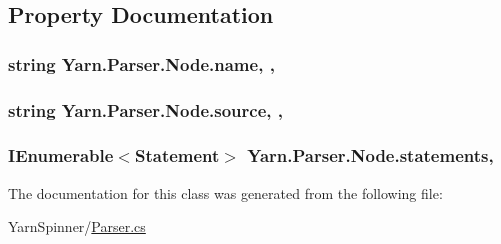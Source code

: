 \subsection{Property Documentation}
\hypertarget{a00054_a3cfa07840da3a7a92c820788e902aefb}{
\subsubsection[{name}]{\setlength{\rightskip}{0pt plus 5cm}string Yarn.\-Parser.\-Node.\-name\hspace{0.3cm}{\ttfamily [get]}, {\ttfamily [set]}, {\ttfamily [package]}}}\label{a00054_a3cfa07840da3a7a92c820788e902aefb}
\hypertarget{a00054_a005a6b0f614beb77708fc5ce8fea66e1}{
\subsubsection[{source}]{\setlength{\rightskip}{0pt plus 5cm}string Yarn.\-Parser.\-Node.\-source\hspace{0.3cm}{\ttfamily [get]}, {\ttfamily [set]}, {\ttfamily [package]}}}\label{a00054_a005a6b0f614beb77708fc5ce8fea66e1}
\hypertarget{a00054_abdae3fb1c6927b38ce29b1b71a00cb12}{
\subsubsection[{statements}]{\setlength{\rightskip}{0pt plus 5cm}I\-Enumerable$<${\bf Statement}$>$ Yarn.\-Parser.\-Node.\-statements\hspace{0.3cm}{\ttfamily [get]}, {\ttfamily [package]}}}\label{a00054_abdae3fb1c6927b38ce29b1b71a00cb12}


The documentation for this class was generated from the following file\-:\begin{DoxyCompactItemize}
\item 
Yarn\-Spinner/\hyperlink{a00122}{Parser.\-cs}\end{DoxyCompactItemize}
